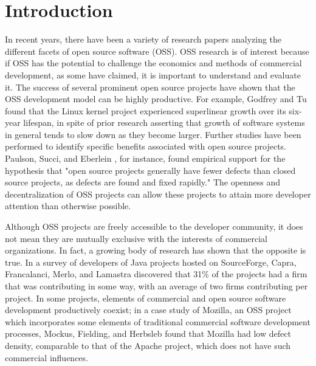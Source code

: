\chapter{Introduction}
In recent years, there have been a variety of research papers analyzing the different facets of open source software (OSS). OSS research is of interest because if OSS has the potential to challenge the economics and methods of commercial development, as some have claimed, it is important to understand and evaluate it\cite{mockus2002two}. The success of several prominent open source projects have shown that the OSS development model can be highly productive. For example, Godfrey and Tu \cite{godfrey2000evolution} found that the Linux kernel project experienced superlinear growth over its six-year lifespan, in spite of prior research asserting that growth of software systems in general tends to slow down as they become larger. Further studies have been performed to identify specific benefits associated with open source projects. Paulson, Succi, and Eberlein \cite{paulson2004empirical}, for instance, found empirical support for the hypothesis that "open source projects generally have fewer defects than closed source projects, as defects are found and fixed rapidly." The openness and decentralization of OSS projects can allow these projects to attain more developer attention than otherwise possible.

Although OSS projects are freely accessible to the developer community, it does not mean they are mutually exclusive with the interests of commercial organizations. In fact, a growing body of research has shown that the opposite is true. In a survey of developers of Java projects hosted on SourceForge, Capra, Francalanci, Merlo, and Lamastra discovered that 31\% of the projects had a firm that was contributing in some way, with an average of two firms contributing per project\cite{capra2009survey}. In some projects, elements of commercial and open source software development productively coexist; in a case study of Mozilla, an OSS project which incorporates some elements of traditional commercial software development processes, Mockus, Fielding, and Herbsleb \cite{mockus2002two} found that Mozilla had low defect density, comparable to that of the Apache project, which does not have such commercial influences.

